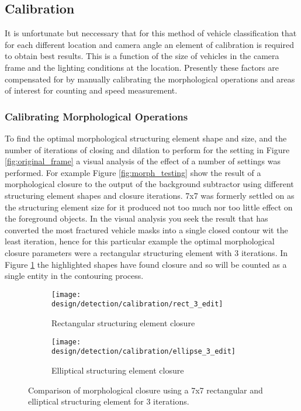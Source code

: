 \subsection{Calibration}
\label{ref:calibration}

It is unfortunate but neccessary that for this method of vehicle classification that for each different location and camera angle an element of calibration is required to obtain best results. This is a function of the size of vehicles in the camera frame and the lighting conditions at the location. Presently these factors are compensated for by manually calibrating the morphological operations and areas of interest for counting and speed measurement. 

\subsubsection{Calibrating Morphological Operations}

To find the optimal morphological structuring element shape and size, and the number of iterations of closing and dilation to perform for the setting in Figure \ref{fig:original_frame} a visual analysis of the effect of a number of settings was performed. For example Figure \ref{fig:morph_testing} show the result of a morphological closure to the output of the background subtractor using different structuring element shapes and closure iterations. 7x7 was formerly settled on as the structuring element size for it produced not too much nor too little effect on the foreground objects. In the visual analysis you seek the result that has converted the most fractured vehicle masks into a single closed contour wit the least iteration, hence for this particular example the optimal morphological closure parameters were a rectangular structuring element with 3 iterations. In Figure \ref{fig:compare_closure} the highlighted shapes have found closure and so will be counted as a single entity in the contouring process.


\begin{figure}[htbp]
    \centering
    \begin{subfigure}[b]{0.42\textwidth}
        \texttt{[image: design/detection/calibration/rect\_3\_edit]}
        \captionsetup{format = hang}
        \caption{Rectangular structuring element closure}
    \end{subfigure}
    \begin{subfigure}[b]{0.42\textwidth}
        \texttt{[image: design/detection/calibration/ellipse\_3\_edit]}
        \captionsetup{format = hang}
        \caption{Elliptical structuring element closure}
    \end{subfigure}
    \captionsetup{format = hang}
    \caption{Comparison of morphological closure using a 7x7 rectangular and elliptical structuring element for 3 iterations.}
    \label{fig:compare_closure}
\end{figure}


